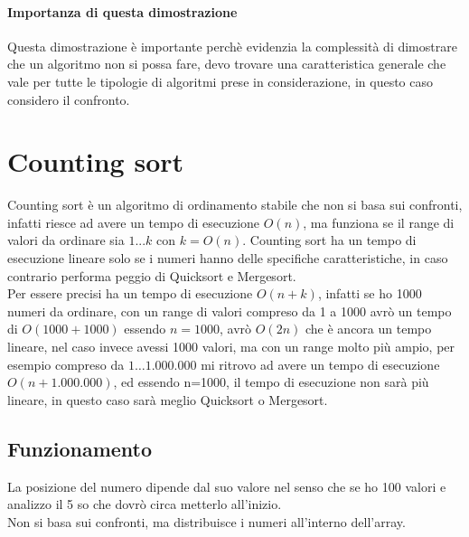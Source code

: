 \paragraph*{Importanza di questa dimostrazione} Questa dimostrazione è importante perchè
evidenzia la complessità di dimostrare che un algoritmo non si possa fare, devo trovare 
una caratteristica generale che vale per tutte le tipologie di algoritmi prese in
considerazione, in questo caso considero il confronto.

\section*{Counting sort}
Counting sort è un algoritmo di ordinamento stabile 
che non si basa sui confronti, infatti riesce ad avere un
tempo di esecuzione $O(n)$, ma funziona se il range di valori da ordinare sia $1...k$
con $k=O(n)$. Counting sort ha un tempo di esecuzione lineare solo se i numeri hanno delle
specifiche caratteristiche, in caso contrario performa peggio di Quicksort e Mergesort.\\
Per essere precisi ha un tempo di esecuzione $O(n+k)$, infatti se ho 1000 numeri da ordinare,
con un range di valori compreso da 1 a 1000 avrò un tempo di $O(1000 + 1000)$ essendo $n=1000$,
avrò $O(2n)$ che è ancora un tempo lineare, nel caso invece avessi 1000 valori, ma con un range molto
più ampio, per esempio compreso da $1\dots 1.000.000$ mi ritrovo ad avere un tempo di esecuzione $O(n+1.000.000)$,
ed essendo n=1000, il tempo di esecuzione non sarà più lineare, in questo caso sarà meglio Quicksort o Mergesort.\\
\subsection{Funzionamento}
La posizione del numero dipende dal suo valore nel senso che se ho 100 valori e analizzo il 5 so che dovrò
circa metterlo all'inizio.\\
Non si basa sui confronti, ma distribuisce i numeri all'interno dell'array.\\
